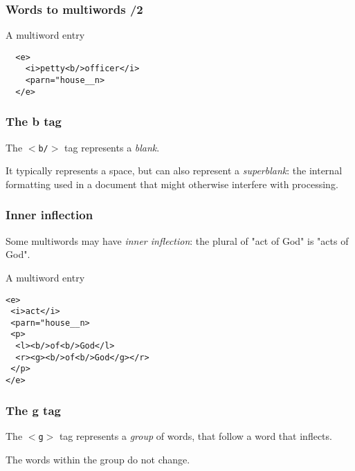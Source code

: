 \documentclass{beamer} %
\begin{document}
\begin{frame}
  \frametitle{Words to multiwords /2}

  \begin{exampleblock}{A multiword entry}
    \begin{footnotesize}
    \begin{alltt}
      ~~<e> \\
      ~~~~<i>petty<b/>officer</i> \\
      ~~~~<par n="house\_\_n> \\
      ~~</e> \\
    \end{alltt}
    \end{footnotesize}
  \end{exampleblock}
\end{frame}
\begin{frame}
  \frametitle{The b tag}
  The {\tt $<$b/$>$} tag represents a {\it blank}.

  It typically represents a space, but can also represent a {\it superblank}:
  the internal formatting used in a document that might otherwise interfere with
  processing.
\end{frame}
\begin{frame}
  \frametitle{Inner inflection}
  Some multiwords may have {\it inner inflection}: the plural of "act of God" is
  "acts of God".

  \pause
  \begin{exampleblock}{A multiword entry}
    \begin{footnotesize}
    \begin{alltt}
      <e> \\
      ~<i>act</i> \\
      ~<par n="house\_\_n> \\
      ~<p> \\
      ~~<l><b/>of<b/>God</l> \\
      ~~<r><g><b/>of<b/>God</g></r> \\
      ~</p> \\
      </e> \\
    \end{alltt}
    \end{footnotesize}
  \end{exampleblock}
\end{frame}
\begin{frame}
  \frametitle{The g tag}
  The {\tt $<$g$>$} tag represents a {\it group} of words, that
  follow a word that inflects.

  The words within the group do not change.
\end{frame}
\end{document}
